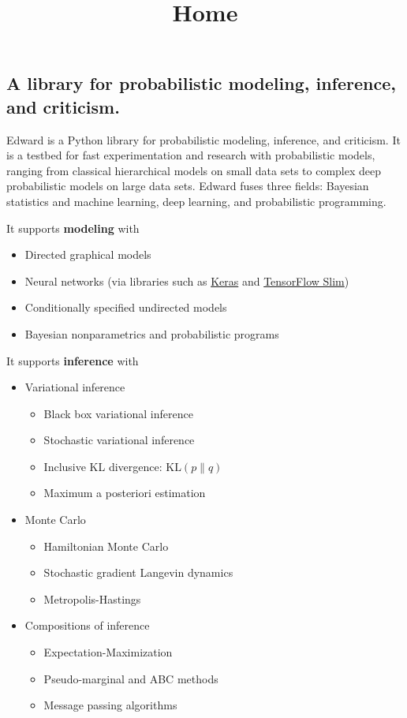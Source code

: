 \title{Home}

\subsection{A library for probabilistic modeling, inference, and criticism.}

Edward is a Python library for probabilistic modeling, inference, and
criticism. It is a testbed for fast experimentation and research with
probabilistic models, ranging from classical hierarchical models on
small data sets to complex deep probabilistic models on large data
sets. Edward fuses three fields: Bayesian statistics and machine
learning, deep learning, and probabilistic programming.

It supports \textbf{modeling} with

\begin{itemize}
\item Directed graphical models
\item Neural networks (via libraries such as
  \href{http://keras.io}{Keras} and
  \href{https://github.com/tensorflow/tensorflow/tree/master/tensorflow/contrib/slim}{TensorFlow
  Slim})
\item Conditionally specified undirected models
\item Bayesian nonparametrics and probabilistic programs
\end{itemize}

It supports \textbf{inference} with

\begin{itemize}
\item Variational inference
  \begin{itemize}
    \item Black box variational inference
    \item Stochastic variational inference
    \item Inclusive KL divergence: $\text{KL}(p\|q)$
    \item Maximum a posteriori estimation
  \end{itemize}
\item Monte Carlo
  \begin{itemize}
    \item Hamiltonian Monte Carlo
    \item Stochastic gradient Langevin dynamics
    \item Metropolis-Hastings
  \end{itemize}
\item Compositions of inference
  \begin{itemize}
    \item Expectation-Maximization
    \item Pseudo-marginal and ABC methods
    \item Message passing algorithms
  \end{itemize}
\end{itemize}

